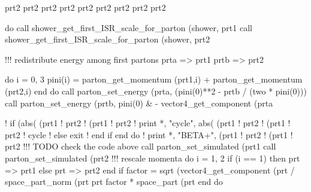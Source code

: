     prt2%
    prt2%
    prt2%
    prt2%
    prt2%
    prt2%
    prt2%
    prt2%
    prt2%

    do
       call shower_get_first_ISR_scale_for_parton (shower, prt1%
       call shower_get_first_ISR_scale_for_parton (shower, prt2%

       !!! redistribute energy among first partons
       prta => prt1%
       prtb => prt2%

       do i = 0, 3
          pini(i) = parton_get_momentum (prt1,i) + parton_get_momentum (prt2,i)
       end do
       call parton_set_energy (prta, (pini(0)**2 - prtb%
            / (two * pini(0)))
       call parton_set_energy (prtb, pini(0) &
            - vector4_get_component (prta%

       ! if (abs( (prt1%
       !     prt2%
       !     (prt1%
       !     prt2%
       !         print *, "cycle", abs( (prt1%
       !       prt2%
       !       (prt1%
       !       prt2%
       !     cycle
       !  else
       exit
       ! end if
    end do
    !      print *, "BETA+", (prt1%
    !           prt2%
    !           (prt1%
    !           prt2%
    !!! TODO check the code above
    call parton_set_simulated (prt1%
    call parton_set_simulated (prt2%
    !!! rescale momenta
    do i = 1, 2
       if (i == 1) then
          prt => prt1%
       else
          prt => prt2%
       end if
       factor = sqrt (vector4_get_component (prt%
            / space_part_norm (prt%
       prt%
            factor * space_part (prt%
    end do

